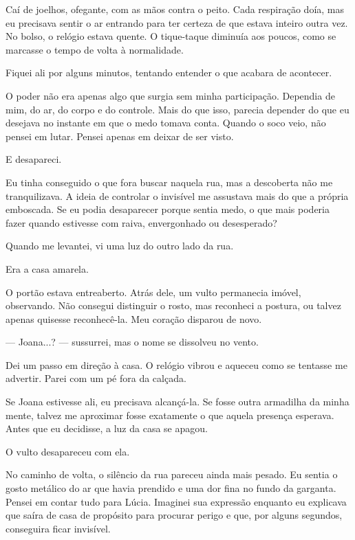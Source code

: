 Caí de joelhos, ofegante, com as mãos contra o peito. Cada respiração doía, mas eu precisava sentir o ar entrando para ter certeza de que estava inteiro outra vez. No bolso, o relógio estava quente. O tique-taque diminuía aos poucos, como se marcasse o tempo de volta à normalidade.

\medskip

Fiquei ali por alguns minutos, tentando entender o que acabara de acontecer.

O poder não era apenas algo que surgia sem minha participação. Dependia de mim, do ar, do corpo e do controle. Mais do que isso, parecia depender do que eu desejava no instante em que o medo tomava conta. Quando o soco veio, não pensei em lutar. Pensei apenas em deixar de ser visto.

E desapareci.

Eu tinha conseguido o que fora buscar naquela rua, mas a descoberta não me tranquilizava. A ideia de controlar o invisível me assustava mais do que a própria emboscada. Se eu podia desaparecer porque sentia medo, o que mais poderia fazer quando estivesse com raiva, envergonhado ou desesperado?

\medskip

Quando me levantei, vi uma luz do outro lado da rua.

Era a casa amarela.

O portão estava entreaberto. Atrás dele, um vulto permanecia imóvel, observando. Não consegui distinguir o rosto, mas reconheci a postura, ou talvez apenas quisesse reconhecê-la. Meu coração disparou de novo.

— Joana...? — sussurrei, mas o nome se dissolveu no vento.

Dei um passo em direção à casa. O relógio vibrou e aqueceu como se tentasse me advertir. Parei com um pé fora da calçada.

Se Joana estivesse ali, eu precisava alcançá-la. Se fosse outra armadilha da minha mente, talvez me aproximar fosse exatamente o que aquela presença esperava. Antes que eu decidisse, a luz da casa se apagou.

O vulto desapareceu com ela.

\medskip

No caminho de volta, o silêncio da rua pareceu ainda mais pesado. Eu sentia o gosto metálico do ar que havia prendido e uma dor fina no fundo da garganta. Pensei em contar tudo para Lúcia. Imaginei sua expressão enquanto eu explicava que saíra de casa de propósito para procurar perigo e que, por alguns segundos, conseguira ficar invisível.

